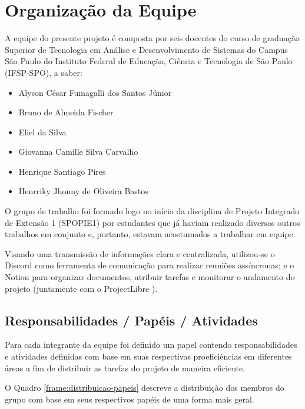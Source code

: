 \section{Organização da Equipe}

A equipe do presente projeto é composta por seis docentes do curso de graduação Superior de Tecnologia em Análise e Desenvolvimento de Sistemas do Campus São Paulo do Instituto Federal de Educação, Ciência e Tecnologia de São Paulo (IFSP-SPO), a saber:

\begin{itemize}
	\item Alyson César Fumagalli dos Santos Júnior
	\item Bruno de Almeida Fischer
	\item Eliel da Silva
	\item Giovanna Camille Silva Carvalho
	\item Henrique Santiago Pires
	\item Henrriky Jhonny de Oliveira Bastos
\end{itemize}

O grupo de trabalho foi formado logo no início da disciplina de Projeto Integrado de Extensão 1 (SPOPIE1) por estudantes que já haviam realizado diversos outros trabalhos em conjunto e, portanto, estavam acostumados a trabalhar em equipe.

Visando uma transmissão de informações clara e centralizada, utilizou-se o Discord \cite{Discord} como ferramenta de comunicação para realizar reuniões assíncronas; e o Notion \cite{Notion} para organizar documentos, atribuir tarefas e monitorar o andamento do projeto (juntamente com o ProjectLibre \cite{ProjectLibre}).

\subsection{Responsabilidades / Papéis / Atividades}

Para cada integrante da equipe foi definido um papel contendo responsabilidades e atividades definidas com base em suas respectivas proeficiências em diferentes áreas a fim de distribuir as tarefas do projeto de maneira eficiente.

O Quadro \ref{frame:distribuicao-papeis} descreve a distribuição dos membros do grupo com base em seus respectivos papéis de uma forma mais geral.

